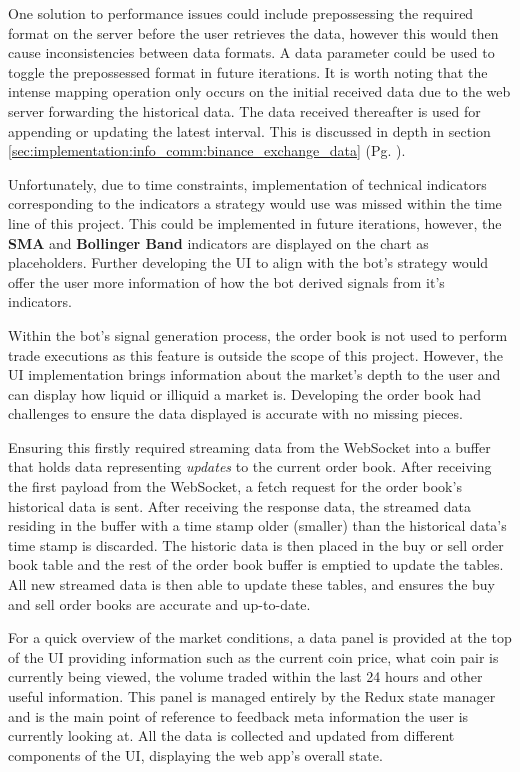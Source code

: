 One solution to performance issues could include prepossessing the required format on the server before the user retrieves the data, however this would then cause inconsistencies between data formats. A data parameter could be used to toggle the prepossessed format in future iterations. It is worth noting that the intense mapping operation only occurs on the initial received data due to the web server forwarding the historical data. The data received thereafter is used for appending or updating the latest interval. This is discussed in depth in section \ref{sec:implementation:info_comm:binance_exchange_data} (Pg. \pageref{sec:implementation:info_comm:binance_exchange_data}).

Unfortunately, due to time constraints, implementation of technical indicators corresponding to the indicators a strategy would use was missed within the time line of this project. This could be implemented in future iterations, however, the \textbf{SMA} and \textbf{Bollinger Band} indicators are displayed on the chart as placeholders. Further developing the UI to align with the bot's strategy would offer the user more information of how the bot derived signals from it's indicators.

Within the bot's signal generation process, the order book is not used to perform trade executions as this feature is outside the scope of this project. However, the UI implementation brings information about the market's depth to the user and can display how liquid or illiquid a market is. Developing the order book had challenges to ensure the data displayed is accurate with no missing pieces.

Ensuring this firstly required streaming data from the WebSocket into a buffer that holds data representing \textit{updates} to the current order book. After receiving the first payload from the WebSocket, a fetch request for the order book's historical data is sent. After receiving the response data, the streamed data residing in the buffer with a time stamp older (smaller) than the historical data's time stamp is discarded. The historic data is then placed in the buy or sell order book table and the rest of the order book buffer is emptied to update the tables. All new streamed data is then able to update these tables, and ensures the buy and sell order books are accurate and up-to-date.

For a quick overview of the market conditions, a data panel is provided at the top of the UI providing information such as the current coin price, what coin pair is currently being viewed, the volume traded within the last 24 hours and other useful information. This panel is managed entirely by the Redux state manager and is the main point of reference to feedback meta information the user is currently looking at. All the data is collected and updated from different components of the UI, displaying the web app's overall state.

